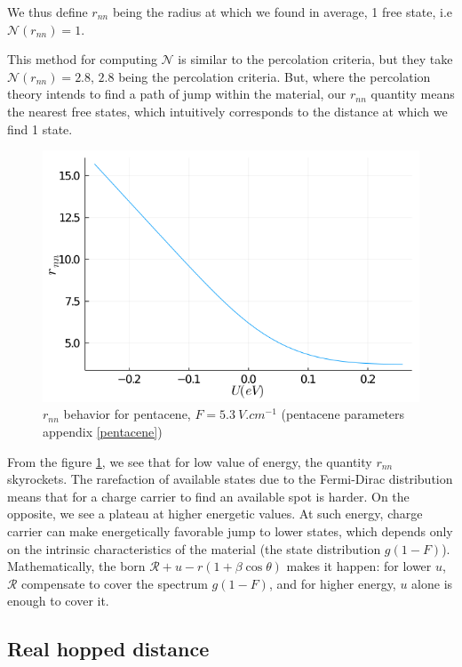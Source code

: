 We thus define $r_{nn}$ being the radius at which we found in average, 1 free state, i.e $\mathcal{N}(r_{nn}) = 1$.

This method for computing $\mathscr{N}$ is similar to the percolation criteria, but they take $\mathcal{N}(r_{nn}) = 2.8$, $2.8$ being the percolation criteria. But, where the percolation theory intends to find a path of jump within the material, our $r_{nn}$ quantity means the nearest free states, which intuitively corresponds to the distance at which we find 1 state.

\begin{figure}[!h]
    \centering
    \includegraphics*[width=.5\paperwidth]{figures/3_elec/rnn.png}
    \caption{$r_{nn}$ behavior for pentacene, $F = \SI{5.3}{V . cm^{-1}}$ (pentacene parameters appendix \ref{pentacene})\label{fig:3_3}}
\end{figure}



From the figure \ref{fig:3_3}, we see that for low value of energy, the quantity $r_{nn}$ skyrockets. The rarefaction of available states due to the Fermi-Dirac distribution means that for a charge carrier to find an available spot is harder. On the opposite, we see a plateau at higher energetic values. At such energy, charge carrier can make energetically favorable jump to lower states, which depends only on the intrinsic characteristics of the material (the state distribution $g(1 - F)$). Mathematically, the born $\mathscr{R}+u-r(1+\beta \cos \theta)$ makes it happen: for lower $u$, $\mathscr{R}$ compensate to cover the spectrum $g(1 - F)$, and for higher energy, $u$ alone is enough to cover it.

\subsection{Real hopped distance}

